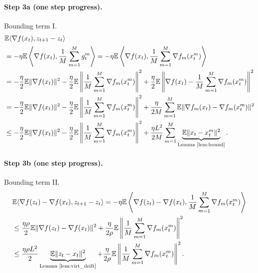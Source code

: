 \paragraph{Step 3a (one step progress).} Bounding term I.
\begin{align*}
&\mathbb{E}\langle \nabla f(x_t), z_{t+1} - z_t \rangle \\
&= -\eta \mathbb{E}\left\langle \nabla f(x_t), \frac{1}{M}\sum_{m=1}^{M} g_t^m \right\rangle
 = -\eta \mathbb{E}\left\langle \nabla f(x_t), \frac{1}{M}\sum_{m=1}^{M} \nabla f_m(x_t^m) \right\rangle \\
&= -\frac{\eta}{2}\mathbb{E}\|\nabla f(x_t)\|^2
  -\frac{\eta}{2}\mathbb{E}\left\|\frac{1}{M}\sum_{m=1}^{M}\nabla f_m(x_t^m)\right\|^2
  +\frac{\eta}{2}\mathbb{E}\left\|\nabla f(x_t) - \frac{1}{M}\sum_{m=1}^{M}\nabla f_m(x_t^m)\right\|^2 \\
&= -\frac{\eta}{2}\mathbb{E}\|\nabla f(x_t)\|^2
  -\frac{\eta}{2}\mathbb{E}\left\|\frac{1}{M}\sum_{m=1}^{M}\nabla f_m(x_t^m)\right\|^2
  +\frac{\eta}{2M}\sum_{m=1}^{M}\mathbb{E}\|\nabla f_m(x_t) - \nabla f_m(x_t^m)\|^2 \\
&\leq -\frac{\eta}{2}\mathbb{E}\|\nabla f(x_t)\|^2
  -\frac{\eta}{2}\mathbb{E}\left\|\frac{1}{M}\sum_{m=1}^{M}\nabla f_m(x_t^m)\right\|^2
  +\frac{\eta L^2}{2M}\sum_{m=1}^{M}\underbrace{\mathbb{E}\|x_t - x_t^m\|^2}_{\text{Lemma~\ref{lem:bound}}}.
\end{align*}

\paragraph{Step 3b (one step progress).} Bounding term II.
\begin{align*}
&\mathbb{E}\langle \nabla f(z_t) - \nabla f(x_t), z_{t+1} - z_t \rangle
= -\eta \mathbb{E}\left\langle \nabla f(z_t) - \nabla f(x_t), \frac{1}{M}\sum_{m=1}^{M}\nabla f_m(x_t^m) \right\rangle \\
&\leq \frac{\eta\rho}{2}\mathbb{E}\|\nabla f(z_t) - \nabla f(x_t)\|^2
  + \frac{\eta}{2\rho}\mathbb{E}\left\|\frac{1}{M}\sum_{m=1}^{M}\nabla f_m(x_t^m)\right\|^2 \\
&\leq \frac{\eta\rho L^2}{2}\underbrace{\mathbb{E}\|z_t - x_t\|^2}_{\text{Lemma~\ref{lem:virt_drift}}}
  + \frac{\eta}{2\rho}\mathbb{E}\left\|\frac{1}{M}\sum_{m=1}^{M}\nabla f_m(x_t^m)\right\|^2.
\end{align*}

